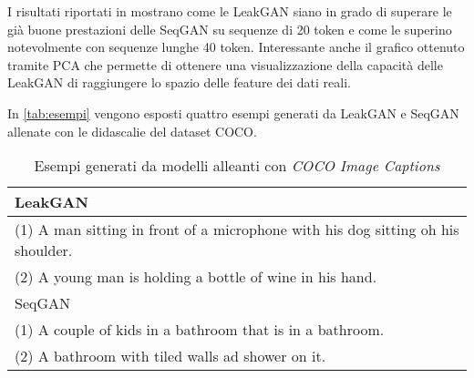 I risultati riportati in \cite{LeakGAN} mostrano come le LeakGAN siano in grado di superare le già buone prestazioni delle SeqGAN su sequenze di 20 token e come le superino notevolmente con sequenze lunghe 40 token.
Interessante anche il grafico ottenuto tramite PCA che permette di ottenere una visualizzazione della capacità delle LeakGAN di raggiungere lo spazio delle feature dei dati reali.


In \autoref{tab:esempi} vengono esposti quattro esempi generati da LeakGAN e SeqGAN allenate con le didascalie del dataset COCO.

\begin{table}[ht]
\centering
\begin{tabular}{|l|} 
\hline
LeakGAN  \\
\hline
(1) A man sitting in front of a microphone with his dog sitting oh his shoulder. \\
(2) A young man is holding a bottle of wine in his hand.  \\
\hline
SeqGAN \\
\hline
(1) A couple of kids in a bathroom that is in a bathroom. \\
(2) A bathroom with tiled walls ad shower on it. \\
\hline
\end{tabular}
\caption{Esempi generati da modelli alleanti con \emph{COCO Image Captions}}
\label{tab:esempi}
\end{table}

